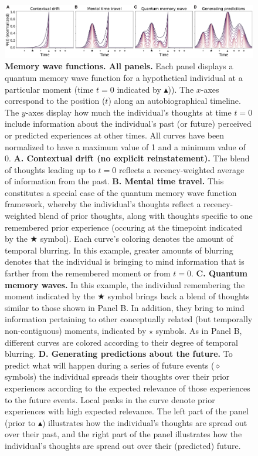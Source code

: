 \documentclass{article}
\begin{document}
\begin{figure}[tp] \centering \includegraphics[width=\textwidth]{figs/wave_functions}
  \caption{\textbf{Memory wave functions. All panels.} Each panel displays a quantum memory wave function for a hypothetical individual at a particular moment (time $t=0$ indicated by $\blacktriangle$)).  The $x$-axes correspond to the position ($t$) along an autobiographical timeline.  The $y$-axes display how much the individual's thoughts at time $t = 0$ include information about the individual's past (or future) perceived or predicted experiences at other times. All curves have been normalized to have a maximum value of 1 and a minimum value of 0.  \textbf{A. Contextual drift (no explicit reinstatement).}  The blend of thoughts leading up to $t = 0$ reflects a recency-weighted average of information from the past.  \textbf{B. Mental time travel.} This constitutes a special case of the quantum memory wave function framework, whereby the individual's thoughts reflect a recency-weighted blend of prior thoughts, along with thoughts specific to one remembered prior experience (occuring at the timepoint indicated by the $\bigstar$ symbol).  Each curve's coloring denotes the amount of temporal blurring.  In this example, greater amounts of blurring denotes that the individual is bringing to mind information that is farther from the remembered moment or from $t = 0$.  \textbf{C. Quantum memory waves.}  In this example, the individual remembering the moment indicated by the $\bigstar$ symbol brings back a blend of thoughts similar to those shown in Panel B.  In addition, they bring to mind information pertaining to other conceptually related (but temporally non-contiguous) moments, indicated by $\star$ symbols. As in Panel B, different curves are colored according to their degree of temporal blurring.  \textbf{D. Generating predictions about the future.} To predict what will happen during a series of future events ($\diamond$ symbols) the individual spreads their thoughts over their prior experiences according to the expected relevance of those experiences to the future events.  Local peaks in the curve denote prior experiences with high expected relevance.  The left part of the panel (prior to $\blacktriangle$) illustrates how the individual's thoughts are spread out over their past, and the right part of the panel illustrates how the individual's thoughts are spread out over their (predicted) future.}
\label{fig:qwave}
\end{figure}
\end{document}
